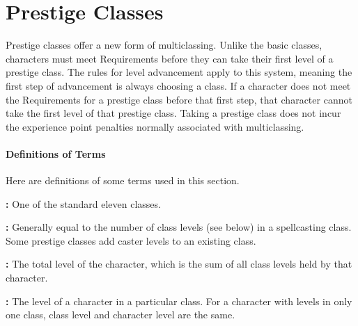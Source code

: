 \chapter{Prestige Classes}\label{chapter:Prestige Classes}

Prestige classes offer a new form of multiclassing. Unlike the basic classes, characters must meet Requirements before they can take their first level of a prestige class. The rules for level advancement apply to this system, meaning the first step of advancement is always choosing a class. If a character does not meet the Requirements for a prestige class before that first step, that character cannot take the first level of that prestige class.  Taking a prestige class does not incur the experience point penalties normally associated with multiclassing.

\subsubsection{Definitions of Terms}

Here are definitions of some terms used in this section.

\textbf{:} One of the standard eleven classes.

\textbf{:} Generally equal to the number of class levels (see below) in a spellcasting class. Some prestige classes add caster levels to an existing class.

\textbf{:} The total level of the character, which is the sum of all class levels held by that character.

\textbf{:} The level of a character in a particular class. For a character with levels in only one class, class level and character level are the same.


\clearpage














